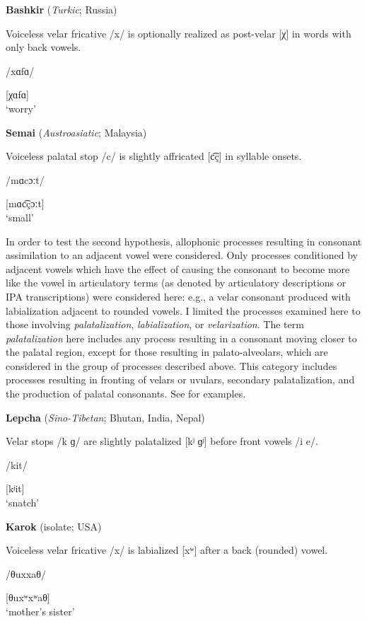 \ea\label{ex:7.4}
  \textbf{Bashkir} (\textit{Turkic}; Russia)

Voiceless velar fricative /x/ is optionally realized as post-velar [χ] in words with only back vowels.

/xɑfɑ/

[χɑfɑ]\\
\glt ‘worry’
\citep[11]{Poppe1964}
\z

\ea\label{ex:7.5}
  \textbf{Semai} (\textit{Austroasiatic}; Malaysia)

Voiceless palatal stop /c/ is slightly affricated [c͡ç] in syllable onsets.

/mɑcɔːt/

[mɑc͡çɔːt]\\
\glt ‘small’
\citep[5]{Philips2007}
\z

  In order to test the second hypothesis, allophonic processes resulting in consonant assimilation to an adjacent vowel were considered. Only processes conditioned by adjacent vowels which have the effect of causing the consonant to become more like the vowel in articulatory terms (as denoted by articulatory descriptions or IPA transcriptions) were considered here: e.g., a velar consonant produced with labialization adjacent to rounded vowels. I limited the processes examined here to those involving \textit{palatalization}, \textit{labialization}, or \textit{velarization}. The term \textit{palatalization} here includes any process resulting in a consonant moving closer to the palatal region, except for those resulting in palato-alveolars, which are considered in the group of processes described above. This category includes processes resulting in fronting of velars or uvulars, secondary palatalization, and the production of palatal consonants. See  for examples.

\ea\label{ex:7.6}
  \textbf{Lepcha} (\textit{Sino-Tibetan}; Bhutan, India, Nepal)

Velar stops /k ɡ/ are slightly palatalized [kʲ ɡʲ] before front vowels /i e/.

/kit/

[kʲit]\\
\glt ‘snatch’
\citep[21]{Plaisier2007}
\z

\ea\label{ex:7.7}
  \textbf{Karok} (isolate; USA)

Voiceless velar fricative /x/ is labialized [xʷ] after a back (rounded) vowel.

/θuxxaθ/

[θuxʷxʷaθ]\\
\glt ‘mother’s sister’
\citep[8]{Bright1957}
\z

